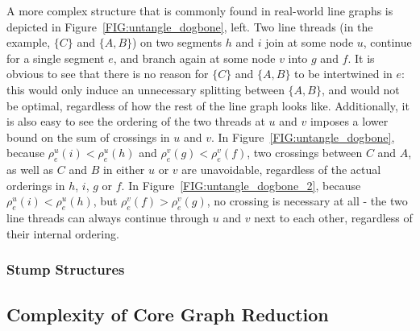 \documentclass[sigconf]{acmart}
\begin{document}
A more complex structure that is commonly found in real-world line graphs is depicted in Figure~\ref{FIG:untangle_dogbone}, left. Two line threads (in the example, $\{C\}$ and $\{A, B\}$) on two segments $h$ and $i$ join at some node $u$, continue for a single segment $e$, and branch again at some node $v$ into $g$ and $f$. It is obvious to see that there is no reason for $\{C\}$ and $\{A, B\}$ to be intertwined in $e$: this would only induce an unnecessary splitting between $\{A, B\}$, and would not be optimal, regardless of how the rest of the line graph looks like. Additionally, it is also easy to see the ordering of the two threads at $u$ and $v$ imposes a lower bound on the sum of crossings in $u$ and $v$. In Figure~\ref{FIG:untangle_dogbone}, because $\rho^u_e(i) < \rho^u_e(h)$ and $\rho^v_e(g) < \rho^v_e(f)$, two crossings between $C$ and $A$, as well as $C$ and $B$ in either $u$ or $v$ are unavoidable, regardless of the actual orderings in $h$, $i$, $g$ or $f$. In Figure~\ref{FIG:untangle_dogbone_2}, because $\rho^u_e(i) < \rho^u_e(h)$, but $\rho^v_e(f) > \rho^v_e(g)$, no crossing is necessary at all - the two line threads can always continue through $u$ and $v$ next to each other, regardless of their internal ordering. 

\subsubsection{Stump Structures}


\subsection{Complexity of Core Graph Reduction}

%
\end{document}
